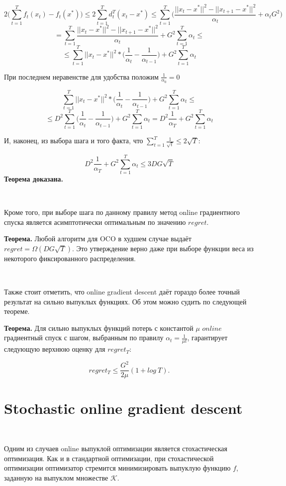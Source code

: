 \documentclass[12pt]{article}
\theoremstyle{definition}
\begin{document}
$$2\bigg(\sum\limits_{t=1}^T f_t(x_t) - f_t(x^*) \bigg) \leq 2\sum\limits_{t=1}^T d_t^T(x_t-x^*) \leq \sum\limits_{t=1}^T 
\bigg(\frac{||x_t-x^*||^2 - ||x_{t+1}-x^*||^2}{\alpha_t} + \alpha_t G^2\bigg)$$
$$= \sum\limits_{t=1}^T 
\frac{||x_t-x^*||^2 - ||x_{t+1}-x^*||^2}{\alpha_t} + G^2 \sum\limits_{t=1}^T \alpha_t \leq $$
$$\leq \sum\limits_{t=1}^T 
||x_t-x^*||^2*\bigg(\frac{1}{\alpha_t}-\frac{1}{\alpha_{t-1}}\bigg) + G^2 \sum\limits_{t=1}^T \alpha_t $$

При последнем неравенстве для удобства положим $\frac{1}{\alpha_0} = 0$

$$\sum\limits_{t=1}^T 
||x_t-x^*||^2*\bigg(\frac{1}{\alpha_t}-\frac{1}{\alpha_{t-1}}\bigg) + G^2 \sum\limits_{t=1}^T \alpha_t \leq $$
$$\leq D^2\sum\limits_{t=1}^T \bigg(\frac{1}{\alpha_t}-\frac{1}{\alpha_{t-1}}\bigg) + G^2 \sum\limits_{t=1}^T \alpha_t = D^2 \frac{1}{\alpha_T} + G^2 \sum\limits_{t=1}^T \alpha_t$$

И, наконец, из выбора шага и того факта, что $\sum\limits_{t=1}^T \frac{1}{\sqrt{t}} \leq 2\sqrt{T}$:

$$D^2 \frac{1}{\alpha_T} + G^2 \sum\limits_{t=1}^T \alpha_t \leq 3DG\sqrt{T}$$
\textbf{Теорема доказана.}

$ $

Кроме того, при выборе шага по данному правилу метод online градиентного спуска является асимптотически оптимальным по значению $regret$.

\textbf{Теорема.} Любой алгоритм для OCO в худшем случае выдаёт $regret = \Omega(DG\sqrt{T})$. Это утверждение верно даже при выборе функции веса из некоторого фиксированного распределения.

$ $

Также стоит отметить, что online gradient descent даёт гораздо более точный результат на сильно выпуклых функциях. Об этом можно судить по следующей теореме.
$ $

\textbf{Теорема.} Для сильно выпуклых функций потерь с константой $\mu$ $online$ градиентный спуск с шагом, выбранным по правилу $\alpha_t = \frac{1}{\mu t}$, гарантирует следующую верхнюю оценку для $regret_T$:

$$regret_{T} \leq \frac{G^2}{2\mu}(1 + log\ T).$$

\section*{Stochastic online gradient descent}
$ $

Одним из случаев online выпуклой оптимизации является стохастическая оптимизация. Как и в стандартной оптимизации, при стохастической оптимизации оптимизатор стремится минимизировать выпуклую функцию $f$, заданную на выпуклом множестве $\mathcal{K}$.
\end{document}
